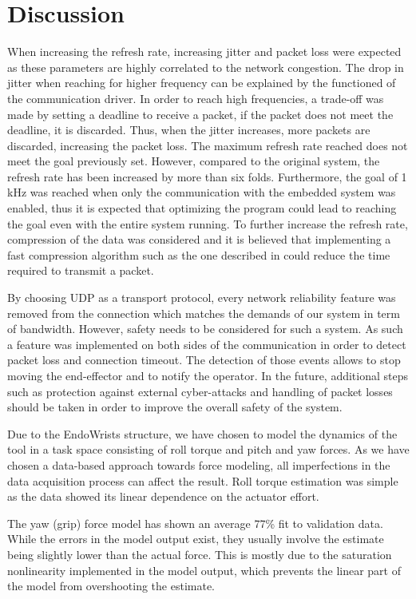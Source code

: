 \section{Discussion}

When increasing the refresh rate, increasing jitter and packet loss were expected as these parameters are highly correlated to the network congestion\cite{cisco_jitter}. The drop in jitter when reaching for higher frequency can be explained by the functioned of the communication driver. In order to reach high frequencies, a trade-off was made by setting a deadline to receive a packet, if the packet does not meet the deadline, it is discarded. Thus, when the jitter increases, more packets are discarded, increasing the packet loss.
The maximum refresh rate reached does not meet the goal previously set. However, compared to the original system, the refresh rate has been increased by more than six folds. Furthermore, the goal of 1 kHz was reached when only the communication with the embedded system was enabled, thus it is expected that optimizing the program could lead to reaching the goal even with the entire system running.
To further increase the refresh rate, compression of the data was considered and it is believed that implementing a fast compression algorithm such as the one described in \cite{fast_ZIV} could reduce the time required to transmit a packet.

By choosing UDP as a transport protocol, every network reliability feature was removed from the connection which matches the demands of our system in term of bandwidth. 
However, safety needs to be considered for such a system. 
As such a feature was implemented on both sides of the communication in order to detect packet loss and connection timeout. 
The detection of those events allows to stop moving the end-effector and to notify the operator. 
In the future, additional steps such as protection against external cyber-attacks and handling of packet losses should be taken in order to improve the overall safety of the system.


Due to the EndoWrists structure, we have chosen to model the dynamics of the tool in a task space consisting of roll torque and pitch and yaw forces.
As we have chosen a data-based approach towards force modeling, all imperfections in the data acquisition process can affect the result.
Roll torque estimation was simple as the data showed its linear dependence on the actuator effort.

The yaw (grip) force model has shown an average 77\% fit to validation data.
While the errors in the model output exist, they usually involve the estimate being slightly lower than the actual force.
This is mostly due to the saturation nonlinearity implemented in the model output, which prevents the linear part of the model from overshooting the estimate.

